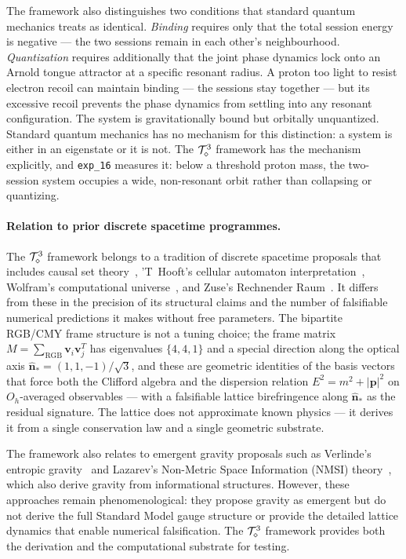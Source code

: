 The framework also distinguishes two conditions that standard quantum
mechanics treats as identical.
\emph{Binding} requires only that the total session energy is negative
--- the two sessions remain in each other's neighbourhood.
\emph{Quantization} requires additionally that the joint phase dynamics
lock onto an Arnold tongue attractor at a specific resonant radius.
A proton too light to resist electron recoil can maintain binding ---
the sessions stay together --- but its excessive recoil prevents the
phase dynamics from settling into any resonant configuration.
The system is gravitationally bound but orbitally unquantized.
Standard quantum mechanics has no mechanism for this distinction: a
system is either in an eigenstate or it is not.
The $\mathcal{T}_\diamond^3$ framework has the mechanism explicitly, and
\texttt{exp\_16} measures it: below a threshold proton mass, the
two-session system occupies a wide, non-resonant orbit rather than
collapsing or quantizing.

\medskip

\paragraph{Relation to prior discrete spacetime programmes.}
The $\mathcal{T}_\diamond^3$ framework belongs to a tradition of discrete spacetime
proposals that includes causal set theory~\cite{bombelli1987},
'T~Hooft's cellular automaton interpretation~\cite{thooft2016},
Wolfram's computational universe~\cite{wolfram2002}, and Zuse's
Rechnender Raum~\cite{zuse1969}.
It differs from these in the precision of its structural claims and the
number of falsifiable numerical predictions it makes without free
parameters.
The bipartite RGB/CMY frame structure is not a tuning choice; the
frame matrix $M = \sum_\text{RGB}\mathbf{v}_i\mathbf{v}_j^T$ has
eigenvalues $\{4, 4, 1\}$ and a special direction along the optical
axis $\hat{\mathbf{n}}_* = (1, 1, -1)/\sqrt{3}$, and these are
geometric identities of the basis vectors that force both the
Clifford algebra and the dispersion relation $E^2 = m^2 + |\mathbf{p}|^2$
on $O_h$-averaged observables --- with a falsifiable lattice
birefringence along $\hat{\mathbf{n}}_*$ as the residual signature.
The lattice does not approximate known physics --- it derives it from
a single conservation law and a single geometric substrate.

The framework also relates to emergent gravity proposals such as
Verlinde's entropic gravity~\cite{verlinde2011} and Lazarev's
Non-Metric Space Information (NMSI) theory~\cite{lazarev2026},
which also derive gravity from informational structures.
However, these approaches remain phenomenological: they propose
gravity as emergent but do not derive the full Standard Model gauge
structure or provide the detailed lattice dynamics that enable
numerical falsification.
The $\mathcal{T}_\diamond^3$ framework provides both the derivation and the
computational substrate for testing.

